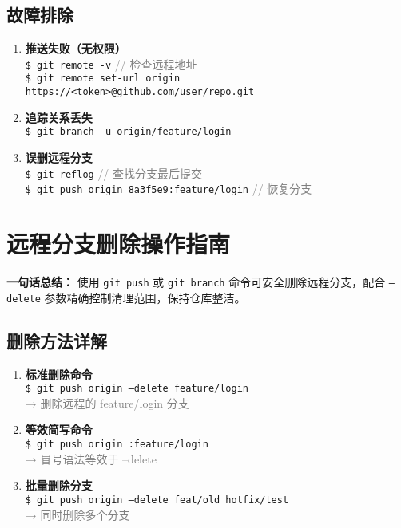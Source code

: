 \subsection{故障排除}
\begin{enumerate}[leftmargin=*, nosep]
    \item \textbf{推送失败（无权限）} \\
    \texttt{\$ git remote -v} \quad \textcolor{gray}{// 检查远程地址} \\
    \texttt{\$ git remote set-url origin https://<token>@github.com/user/repo.git}
    
    \item \textbf{追踪关系丢失} \\
    \texttt{\$ git branch -u origin/feature/login}
    
    \item \textbf{误删远程分支} \\
    \texttt{\$ git reflog} \quad \textcolor{gray}{// 查找分支最后提交} \\
    \texttt{\$ git push origin 8a3f5e9:feature/login} \quad \textcolor{gray}{// 恢复分支}
\end{enumerate}


\section{远程分支删除操作指南}
\textbf{一句话总结：}  
使用 \texttt{git push} 或 \texttt{git branch} 命令可安全删除远程分支，配合 \texttt{--delete} 参数精确控制清理范围，保持仓库整洁。

\subsection{删除方法详解}
\begin{enumerate}[leftmargin=*, nosep]
    \item \textbf{标准删除命令} \\
    {\color{red}\texttt{\$ git push origin --delete feature/login} }\\
    \textcolor{gray}{→ 删除远程的 feature/login 分支}
    
    \item \textbf{等效简写命令} \\
    \texttt{\$ git push origin :feature/login} \\
    \textcolor{gray}{→ 冒号语法等效于 --delete}
    
    \item \textbf{批量删除分支} \\
    \texttt{\$ git push origin --delete feat/old hotfix/test} \\
    \textcolor{gray}{→ 同时删除多个分支}
\end{enumerate}

